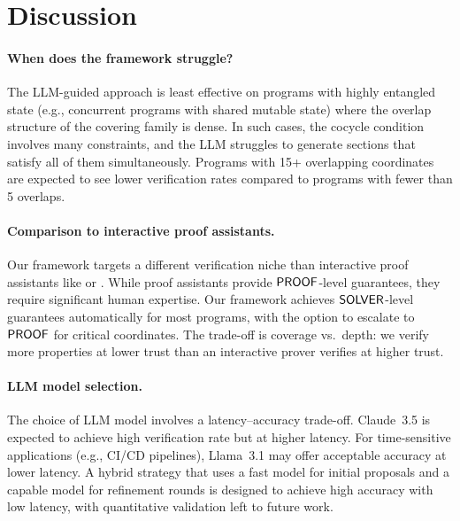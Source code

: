 \documentclass[11pt]{article}
\begin{document}
\section{Discussion}\label{sec:discussion}

\paragraph{When does the framework struggle?}
The LLM-guided approach is least effective on programs with highly
entangled state (e.g., concurrent programs with shared mutable state)
where the overlap structure of the covering family is dense.  In such
cases, the cocycle condition involves many constraints, and the LLM
struggles to generate sections that satisfy all of them simultaneously.
Programs with 15+ overlapping coordinates are expected to see lower verification rates
compared to programs with fewer than 5 overlaps.

\paragraph{Comparison to interactive proof assistants.}
Our framework targets a different verification niche than interactive
proof assistants like \LEAN{} or \Coq.  While proof assistants provide
$\mathsf{PROOF}$-level guarantees, they require significant human expertise.
Our framework achieves $\mathsf{SOLVER}$-level guarantees automatically for
most programs, with the option to escalate to $\mathsf{PROOF}$ for critical
coordinates.  The trade-off is coverage vs.\ depth: we verify more
properties at lower trust than an interactive prover verifies at
higher trust.

\paragraph{LLM model selection.}
The choice of LLM model involves a latency--accuracy trade-off.
Claude~3.5 is expected to achieve high verification rate but at higher
latency.  For time-sensitive applications (e.g., CI/CD pipelines),
Llama~3.1 may offer acceptable accuracy at lower latency.  A
hybrid strategy that uses a fast model for initial proposals and a
capable model for refinement rounds is designed to achieve high accuracy with low latency, with quantitative validation left to future work.
\end{document}
